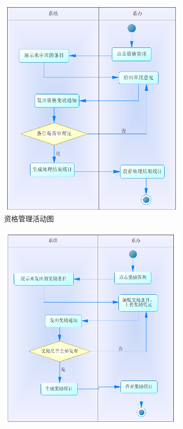 \documentclass[12pt, a4paper, oneside]{ctexart}
\begin{document}
\begin{figure}[H]
    \begin{subfigure}{0.5\linewidth}
        \centering
        \includegraphics[width = 1\textwidth]{../pic/3/3.2.png}
        \caption{资格管理活动图}
    \end{subfigure}
    \begin{subfigure}{0.5\linewidth}
        \centering
        \includegraphics[width = 1\textwidth]{../pic/3/3.3.png}

\end{subfigure}
\end{figure}
\end{document}
